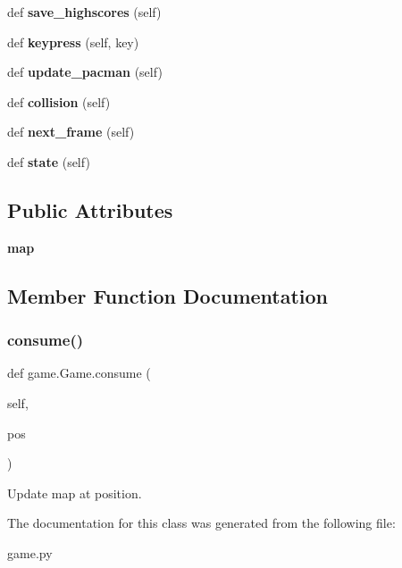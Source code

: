 \begin{DoxyCompactItemize}
def {\bfseries save\+\_\+highscores} (self)
\item 
\mbox{\label{classgame_1_1_game_aea7e11cff1bed1ca71f71bc1676335af}} 
def {\bfseries keypress} (self, key)
\item 
\mbox{\label{classgame_1_1_game_a0b5821a5b05fa17ac83285b964358261}} 
def {\bfseries update\+\_\+pacman} (self)
\item 
\mbox{\label{classgame_1_1_game_acb36ac554fe3af00ce5fe1e5fc743ceb}} 
def {\bfseries collision} (self)
\item 
\mbox{\label{classgame_1_1_game_acacbdfad94b0348c272dba4a12a0697b}} 
def {\bfseries next\+\_\+frame} (self)
\item 
\mbox{\label{classgame_1_1_game_a758a114e38ce76e0b1de8da4c3aea922}} 
def {\bfseries state} (self)
\end{DoxyCompactItemize}
\subsection*{Public Attributes}
\begin{DoxyCompactItemize}
\item 
\mbox{\label{classgame_1_1_game_a41a396b1b2e6aee658c810f3213c00cc}} 
{\bfseries map}
\end{DoxyCompactItemize}


\subsection{Member Function Documentation}
\mbox{\label{classgame_1_1_game_aa6fee1ef0d9559a469a2fe3de270cceb}} 
\subsubsection{\texorpdfstring{consume()}{consume()}}
{\footnotesize\ttfamily def game.\+Game.\+consume (\begin{DoxyParamCaption}\item[{}]{self,  }\item[{}]{pos }\end{DoxyParamCaption})}

\begin{DoxyVerb}Update map at position.\end{DoxyVerb}
 

The documentation for this class was generated from the following file\+:\begin{DoxyCompactItemize}
\item 
game.\+py\end{DoxyCompactItemize}

